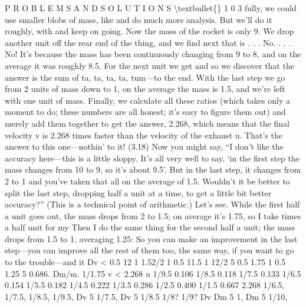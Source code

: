 \documentclass[10pt,oneside]{article}
\begin{document}
P R O B L E M S  A N D  S O L U T I O N S \textbackslash{}textbullet\{\} 1 0 3 fully, we could use smaller blobs of mass, like and do much more analysis. But we’ll do it roughly, with and keep on going. Now the mass of the rocket is only 9. We drop another unit off the rear end of the thing, and we find next that is . . . No. . . . No! It’s because the mass has been continuously changing from 9 to 8, and on the average it was roughly 8.5. For the next unit we get and so we discover that the answer is the sum of ta, ta, ta, ta, tum---to the end. With the last step we go from 2 units of mass down to 1, on the average the mass is 1.5, and we’re left with one unit of mass. Finally, we calculate all these ratios (which takes only a moment to do; these numbers are all honest; it’s easy to figure them out) and merely add them together to get the answer, 2.268, which means that the final velocity v is 2.268 times faster than the velocity of the exhaust u. That’s the answer to this one---nothin’ to it! (3.18) Now you might say, “I don’t like the accuracy here---this is a little sloppy. It’s all very well to say, ‘in the first step the mass changes from 10 to 9, so it’s about 9.5’. But in the last step, it changes from 2 to 1 and you’ve taken that all on the average of 1.5. Wouldn’t it be better to split the last step, dropping half a unit at a time, to get a little bit better accuracy?” (This is a technical point of arithmetic.) Let’s see. While the first half a unit goes out, the mass drops from 2 to 1.5; on average it’s 1.75, so I take times a half unit for my Then I do the same thing for the second half a unit; the mass drops from 1.5 to 1, averaging 1.25: So you can make an improvement in the last step---you can improve all the rest of them too, the same way, if you want to go to the trouble---and it Dv < 0.5 12 1 1.52/2 1 0.5 11.5 1  12/2 5 0.5 1.75 1 0.5 1.25 5 0.686. Dm/m. 1/1.75 v < 2.268 u 1/9.5 0.106 1/8.5 0.118 1/7.5 0.133 1/6.5 0.154 1/5.5 0.182 1/4.5 0.222 1/3.5 0.286 1/2.5 0.400 1/1.5 0.667 2.268 1/6.5, 1/7.5, 1/8.5, 1/9.5, Dv 5 1/7.5, Dv 5 1/8.5 1/8? 1/9? Dv Dm 5 1, Dm 5 1/10,\par
\end{document}
